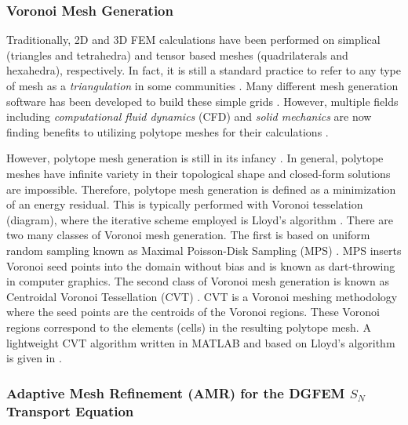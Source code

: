 \subsubsection{Voronoi Mesh Generation}
\label{sec::Intro_Past_Polytopes_Voronoi}

Traditionally, 2D and 3D FEM calculations have been performed on simplical (triangles and tetrahedra) and tensor based meshes (quadrilaterals and hexahedra), respectively. In fact, it is still a standard practice to refer to any type of mesh as a {\em triangulation} in some communities \cite{ern2013theory}. Many different mesh generation software has been developed to build these simple grids \cite{shewchuk1996triangle,shewchuk2002delaunay,si2015tetgen,geuzaine2009gmsh}. However, multiple fields including {\em computational fluid dynamics} (CFD) and {\em solid mechanics} are now finding benefits to utilizing polytope meshes for their calculations \cite{ref::star_CCM,yip2005automated}.

However, polytope mesh generation is still in its infancy \cite{yip2005automated,sieger2010optimizing,ebeida2011uniform}. In general, polytope meshes have infinite variety in their topological shape and closed-form solutions are impossible. Therefore, polytope mesh generation is defined as a minimization of an energy residual. This is typically performed with Voronoi tesselation (diagram), where the iterative scheme employed is Lloyd's algorithm \cite{lloyd1982least,linde1980algorithm}. There are two many classes of Voronoi mesh generation. The first is based on uniform random sampling known as Maximal Poisson-Disk Sampling (MPS) \cite{ebeida2011uniform,ebeida2011efficient,ebeida2012simple}. MPS inserts Voronoi seed points into the domain without bias and is known as dart-throwing in computer graphics. The second class of Voronoi mesh generation is known as Centroidal Voronoi Tessellation (CVT) \cite{du1999centroidal,valette2004approximated}. CVT is a Voronoi meshing methodology where the seed points are the centroids of the Voronoi regions. These Voronoi regions correspond to the elements (cells) in the resulting polytope mesh. A lightweight CVT algorithm written in MATLAB and based on Lloyd's algorithm is given in \cite{talischi2012polymesher}.

\subsubsection{Adaptive Mesh Refinement (AMR) for the DGFEM $S_N$ Transport Equation}
\label{sec::Intro_Past_Polytopes_AMR}

